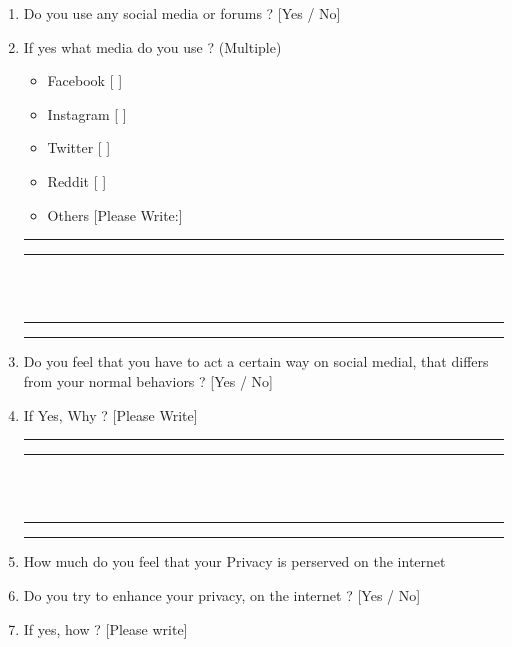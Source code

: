 \documentclass[11pt]{article}
\begin{document}
\begin{enumerate}
    \newpage
    
    \item Do you use any social media or forums ?                   [Yes / No]
    \item If yes what media do you use ? (Multiple)
    \begin{itemize}
        \item Facebook  [ ]
        \item Instagram [ ]
        \item Twitter   [ ]
        \item Reddit    [ ]
        \item Others    [Please Write:]
    \end{itemize}
    
    \begin{left}
        \rule{0.5\textwidth}{.4pt}
    \end{left}
    \begin{left}
        \rule{0.5\textwidth}{.4pt}
    \end{left}\\\\
    \begin{left}
        \rule{0.5\textwidth}{.4pt}
    \end{left}
    \begin{left}
        \rule{0.5\textwidth}{.4pt}
    \end{left}
    
    \item Do you feel that you have to act a certain way on social medial, that differs from your normal behaviors ?                                          [Yes / No]
    \item If Yes, Why ?                                         [Please Write]
    
    \begin{left}
        \rule{0.5\textwidth}{.4pt}
    \end{left}
    \begin{left}
        \rule{0.5\textwidth}{.4pt}
    \end{left}\\\\
    \begin{left}
        \rule{0.5\textwidth}{.4pt}
    \end{left}
    \begin{left}
        \rule{0.5\textwidth}{.4pt}
    \end{left}
    
    \item How much do you feel that your Privacy is perserved on the internet \\
    [ Not at all / To a point of satisfaction / Totally Perserved ]
    \item Do you try to enhance your privacy, on the internet ? [Yes / No]
    \item If yes, how ?                                         [Please write]
    

\end{enumerate}
\end{document}
